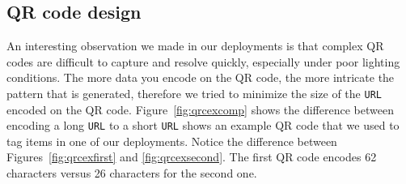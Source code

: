 \subsection{QR code design}
\label{sec:qrcodedesign}

An interesting observation we made in our deployments is that complex QR codes are difficult to capture and resolve
quickly, especially under poor lighting conditions.
The more data you encode on the QR code, the more 
intricate the pattern that is generated, therefore we tried to minimize the size of the {\tt URL} encoded on the QR code.  
Figure~\ref{fig:qrcexcomp} shows the difference between encoding a 
long %
{\tt URL} to a short {\tt URL} shows an %
example QR code that we used to tag items in one of our deployments.  Notice the difference between Figures~\ref{fig:qrcexfirst} 
and \ref{fig:qrcexsecond}.  The first QR code encodes 62 characters versus 26 characters for the second one.


